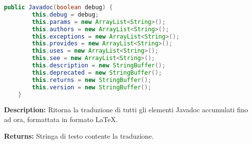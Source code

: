 \documentclass{article}
\begin{document}
\begin{lstlisting}[language=Java]
    public Javadoc(boolean debug) {
        this.debug = debug;
        this.params = new ArrayList<String>();
        this.authors = new ArrayList<String>();
        this.exceptions = new ArrayList<String>();
        this.provides = new ArrayList<String>();
        this.uses = new ArrayList<String>();
        this.see = new ArrayList<String>();
        this.description = new StringBuffer();
        this.deprecated = new StringBuffer();
        this.returns = new StringBuffer();
        this.version = new StringBuffer();
    }
\end{lstlisting}
\vspace{0.5cm}
\textbf{Description:}  Ritorna la traduzione di tutti gli elementi Javadoc accumulati fino ad ora, formattata in formato LaTeX.  

\textbf{Returns:}
Stringa di testo contente la traduzione.  
\end{document}

